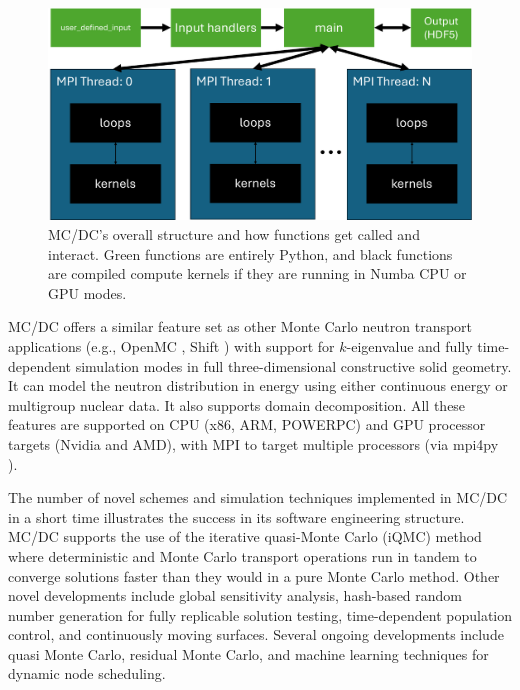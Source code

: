 \begin{figure}
    \centerline{\includegraphics[width=.95\textwidth]{figures/cise_figs/flow.pdf}}
    \caption{MC/DC's overall structure and how functions get called and interact. Green functions are entirely Python, and black functions are compiled compute kernels if they are running in Numba CPU or GPU modes.}\vspace*{-5pt}
    \label{mpi_mcdc}
\end{figure}

MC/DC offers a similar feature set as other Monte Carlo neutron transport applications (e.g., OpenMC \cite{romano_openmc_2015}, Shift \cite{hamilton_continuous-energy_2019}) with support for $k$-eigenvalue and fully time-dependent simulation modes in full three-dimensional constructive solid geometry.
It can model the neutron distribution in energy using either continuous energy or multigroup nuclear data.
It also supports domain decomposition.
All these features are supported on CPU (x86, ARM, POWERPC) and GPU processor targets (Nvidia and AMD), with MPI to target multiple processors (via mpi4py \cite{dalcin_mpi4py_2021}).

The number of novel schemes and simulation techniques implemented in MC/DC in a short time illustrates the success in its software engineering structure.
MC/DC supports the use of the iterative quasi-Monte Carlo (iQMC) method where deterministic and Monte Carlo transport operations run in tandem to converge solutions faster than they would in a pure Monte Carlo method. %
Other novel developments include global sensitivity analysis, hash-based random number generation for fully replicable solution testing, time-dependent population control, and continuously moving surfaces.
Several ongoing developments include quasi Monte Carlo, residual Monte Carlo, and machine learning techniques for dynamic node scheduling.

